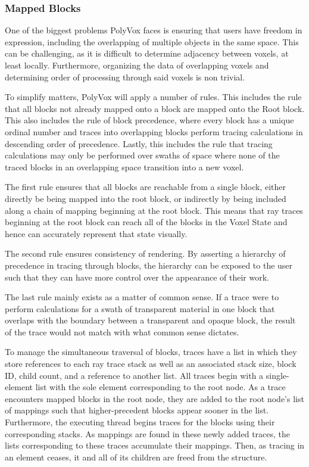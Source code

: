 \documentclass[onecolumn, draftclsnofoot,10pt, compsoc]{IEEEtran}
\begin{document}
\subsubsection{Mapped Blocks}

One of the biggest problems PolyVox faces is ensuring that users have freedom in expression, including the overlapping of multiple objects in the same space. This can be challenging, as it is difficult to determine adjacency between voxels, at least locally. Furthermore, organizing the data of overlapping voxels and determining order of processing through said voxels is non trivial.

To simplify matters, PolyVox will apply a number of rules. This includes the rule that all blocks not already mapped onto a block are mapped onto the Root block. This also includes the rule of block precedence, where every block has a unique ordinal number and traces into overlapping blocks perform tracing calculations in descending order of precedence. Lastly, this includes the rule that tracing calculations may only be performed over swaths of space where none of the traced blocks in an overlapping space transition into a new voxel. 

The first rule ensures that all blocks are reachable from a single block, either directly be being mapped into the root block, or indirectly by being included along a chain of mapping beginning at the root block. This means that ray traces beginning at the root block can reach all of the blocks in the Voxel State and hence can accurately represent that state visually.

The second rule ensures consistency of rendering. By asserting a hierarchy of precedence in tracing through blocks, the hierarchy can be exposed to the user such that they can have more control over the appearance of their work.

The last rule mainly exists as a matter of common sense. If a trace were to perform calculations for a swath of transparent material in one block that overlaps with the boundary between a transparent and opaque block, the result of the trace would not match with what common sense dictates.

To manage the simultaneous traversal of blocks, traces have a list in which they store references to each ray trace stack as well as an associated stack size, block ID, child count, and a reference to another list. All traces begin with a single-element list with the sole element corresponding to the root node. As a trace encounters mapped blocks in the root node, they are added to the root node’s list of mappings such that higher-precedent blocks appear sooner in the list. Furthermore, the executing thread begins traces for the blocks using their corresponding stacks. As mappings are found in these newly added traces, the lists corresponding to these traces accumulate their mappings. Then, as tracing in an element ceases, it and all of its children are freed from the structure.
\end{document}
